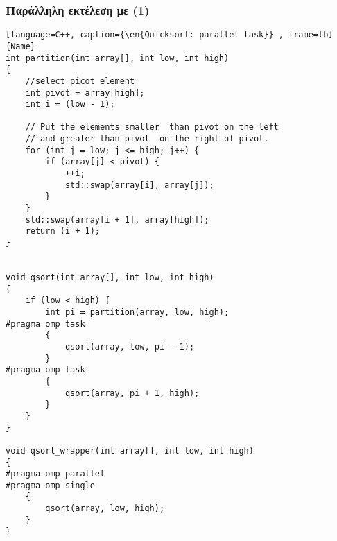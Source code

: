 \clearpage
\subsubsection{Παράλληλη εκτέλεση με  (1)}
\begin{spacing}{0.6}
\begin{lstlisting}[language=C++, caption={\en{Quicksort: parallel task}} , frame=tb]{Name}
int partition(int array[], int low, int high)
{
    //select picot element
    int pivot = array[high];
    int i = (low - 1);

    // Put the elements smaller  than pivot on the left
    // and greater than pivot  on the right of pivot.
    for (int j = low; j <= high; j++) {
        if (array[j] < pivot) {
            ++i;
            std::swap(array[i], array[j]);
        }
    }
    std::swap(array[i + 1], array[high]);
    return (i + 1);
}


void qsort(int array[], int low, int high)
{
    if (low < high) {
        int pi = partition(array, low, high);
#pragma omp task
        {
            qsort(array, low, pi - 1);
        }
#pragma omp task
        {
            qsort(array, pi + 1, high);
        }
    }
}

void qsort_wrapper(int array[], int low, int high)
{
#pragma omp parallel
#pragma omp single
    {
        qsort(array, low, high);
    }
}
\end{lstlisting}
\end{spacing}

